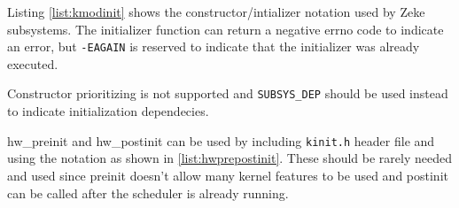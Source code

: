 Listing \ref{list:kmodinit} shows the constructor/intializer notation used by
Zeke subsystems. The initializer function can return a negative errno code to
indicate an error, but \verb+-EAGAIN+ is reserved to indicate that the
initializer was already executed.



Constructor prioritizing is not supported and \verb+SUBSYS_DEP+ should be used
instead to indicate initialization dependecies.

hw\_preinit and hw\_postinit can be used by including \verb+kinit.h+ header file
and using the notation as shown in \ref{list:hwprepostinit}. These should be
rarely needed and used since preinit doesn't allow many kernel features to be
used and postinit can be called after the scheduler is already running.


